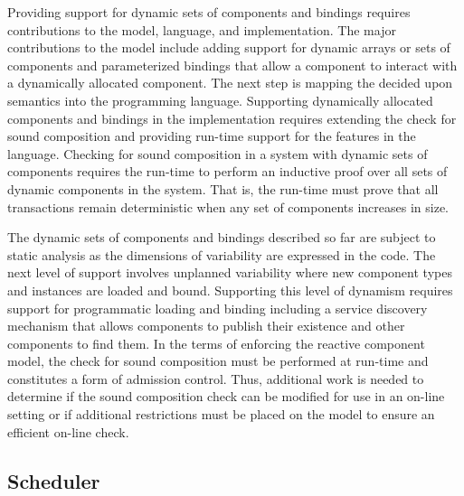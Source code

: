 Providing support for dynamic sets of components and bindings requires contributions to the model, language, and implementation.
The major contributions to the model include adding support for dynamic arrays or sets of components and parameterized bindings that allow a component to interact with a dynamically allocated component.
The next step is mapping the decided upon semantics into the \rcgo{} programming language.
Supporting dynamically allocated components and bindings in the implementation requires extending the check for sound composition and providing run-time support for the features in the language.
Checking for sound composition in a system with dynamic sets of components requires the run-time to perform an inductive proof over all sets of dynamic components in the system.
That is, the run-time must prove that all transactions remain deterministic when any set of components increases in size.

The dynamic sets of components and bindings described so far are subject to static analysis as the dimensions of variability are expressed in the code.
The next level of support involves unplanned variability where new component types and instances are loaded and bound.
Supporting this level of dynamism requires support for programmatic loading and binding including a service discovery mechanism that allows components to publish their existence and other components to find them.
In the terms of enforcing the reactive component model, the check for sound composition must be performed at run-time and constitutes a form of admission control.
Thus, additional work is needed to determine if the sound composition check can be modified for use in an on-line setting or if additional restrictions must be placed on the model to ensure an efficient on-line check.

\subsection{Scheduler}


